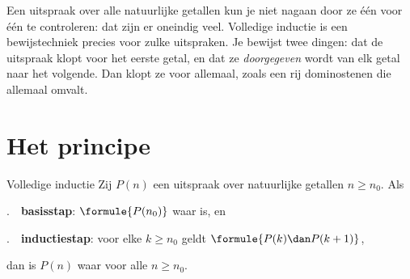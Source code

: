 %



Een uitspraak over alle natuurlijke getallen kun je niet nagaan door ze één voor één te controleren: dat zijn er oneindig veel. Volledige inductie is een bewijstechniek precies voor zulke uitspraken. Je bewijst twee dingen: dat de uitspraak klopt voor het eerste getal, en dat ze \textit{doorgegeven} wordt van elk getal naar het volgende. Dan klopt ze voor allemaal, zoals een rij dominostenen die allemaal omvalt.

\begin{oefeningen}[Start]

\end{oefeningen}

\section{Het principe}

\begin{theorie}
\begin{stelling}{Volledige inductie}
Zij $P(n)$ een uitspraak over natuurlijke getallen $n \geqslant n_0$. Als

\vspace{1mm}
.\ \ \textbf{\textcolor{accent}{basisstap}}: $\formule{P(n_0)}$ waar is, en

.\ \ \textbf{\textcolor{accent}{inductiestap}}: voor elke $k \geqslant n_0$ geldt $\formule{P(k) \dan P(k + 1)}$,

\vspace{1mm}
dan is $P(n)$ waar voor alle $n \geqslant n_0$.
\end{stelling}
\end{theorie}

